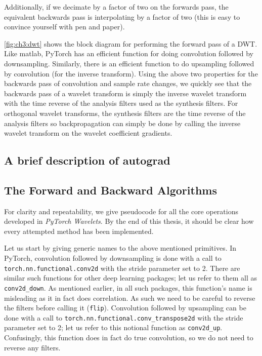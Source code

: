 Additionally, if we decimate by a factor of two on the forwards pass, the
equivalent backwards pass is interpolating by a factor of two (this is easy to
convince yourself with pen and paper).

\autoref{fig:ch3:dwt} shows the block diagram for performing the forward pass of
a DWT. Like matlab, PyTorch has an efficient function for doing convolution
followed by downsampling. Similarly, there is an efficient function to do
upsampling followed by convolution (for the inverse transform). Using the above
two properties for the backwards pass of convolution and sample rate
changes, we quickly see that the backwards pass of a wavelet transform is simply
the inverse wavelet transform with the time reverse of the analysis filters used
as the synthesis filters. For orthogonal wavelet transforms, the synthesis
filters are the time reverse of the analysis filters so backpropagation can
simply be done by calling the inverse wavelet transform on the wavelet
coefficient gradients.

\subsection{A brief description of autograd}

\subsection{The Forward and Backward Algorithms}
For clarity and repeatability, we give pseudocode for all the core operations
developed in \emph{PyTorch Wavelets}. By the end of this thesis, it should be
clear how every attempted method has been implemented.

Let us start by giving generic names to the above mentioned primitives. In
PyTorch, convolution followed by downsampling is done with a call to
\texttt{torch.nn.functional.conv2d} with the stride parameter set to 2. There are
similar such functions for other deep learning packages; let us refer to them
all as \texttt{conv2d_down}. As mentioned earlier, in all such packages, this
function's name is misleading as it in fact does correlation. As such we need to
be careful to reverse the filters before calling it (\texttt{flip}). Convolution
followed by upsampling can be done with a call to
\texttt{torch.nn.functional.conv_transpose2d} with the stride parameter set to
2; let us refer to this notional function as \texttt{conv2d_up}. Confusingly,
this function does in fact do true convolution, so we do not need to reverse any
filters. 

